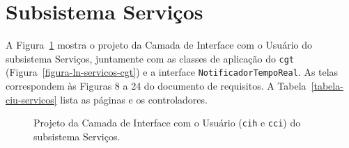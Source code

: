 \section{Subsistema Serviços}
\label{sec-ihc-servicos}

A Figura~\ref{figura-ciu-servicos} mostra o projeto da Camada de Interface com o Usuário do subsistema Serviços, juntamente com as classes de aplicação do \texttt{cgt} (Figura~\ref{figura-ln-servicos-cgt}) e a interface \texttt{NotificadorTempoReal}. As telas correspondem às Figuras 8 a 24 do documento de requisitos. A Tabela~\ref{tabela-ciu-servicos} lista as páginas e os controladores.

\begin{figure}[h]
	\centering
	\caption{Projeto da Camada de Interface com o Usuário (\texttt{cih} e \texttt{cci}) do subsistema Serviços.}
	\label{figura-ciu-servicos}
\end{figure}

